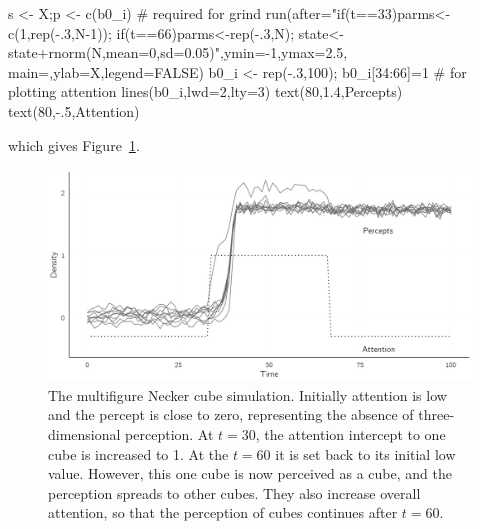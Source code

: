 \documentclass[
  a4paper,
  DIV=11,
  numbers=noendperiod,
  oneside]{scrreprt}
\newenvironment{Shaded}{\begin{snugshade}}{\end{snugshade}}
\newcommand{\AttributeTok}[1]{\textcolor[rgb]{0.40,0.45,0.13}{#1}}
\newcommand{\CommentTok}[1]{\textcolor[rgb]{0.37,0.37,0.37}{#1}}
\newcommand{\ConstantTok}[1]{\textcolor[rgb]{0.56,0.35,0.01}{#1}}
\newcommand{\DecValTok}[1]{\textcolor[rgb]{0.68,0.00,0.00}{#1}}
\newcommand{\FloatTok}[1]{\textcolor[rgb]{0.68,0.00,0.00}{#1}}
\newcommand{\FunctionTok}[1]{\textcolor[rgb]{0.28,0.35,0.67}{#1}}
\newcommand{\NormalTok}[1]{\textcolor[rgb]{0.00,0.23,0.31}{#1}}
\newcommand{\OtherTok}[1]{\textcolor[rgb]{0.00,0.23,0.31}{#1}}
\newcommand{\SpecialCharTok}[1]{\textcolor[rgb]{0.37,0.37,0.37}{#1}}
\newcommand{\StringTok}[1]{\textcolor[rgb]{0.13,0.47,0.30}{#1}}
\begin{document}
\begin{Shaded}
\begin{Highlighting}[]
\NormalTok{s }\OtherTok{\textless{}{-}}\NormalTok{ X;p }\OtherTok{\textless{}{-}} \FunctionTok{c}\NormalTok{(b0\_i) }\CommentTok{\# required for grind}
\FunctionTok{run}\NormalTok{(}\AttributeTok{after=}\StringTok{"if(t==33)parms\textless{}{-}c(1,rep({-}.3,N{-}1));}
\StringTok{           if(t==66)parms\textless{}{-}rep({-}.3,N);}
\StringTok{           state\textless{}{-}state+rnorm(N,mean=0,sd=0.05)"}\NormalTok{,}\AttributeTok{ymin=}\SpecialCharTok{{-}}\DecValTok{1}\NormalTok{,}\AttributeTok{ymax=}\FloatTok{2.5}\NormalTok{,}
            \AttributeTok{main=}\StringTok{\textquotesingle{}\textquotesingle{}}\NormalTok{,}\AttributeTok{ylab=}\StringTok{\textquotesingle{}X\textquotesingle{}}\NormalTok{,}\AttributeTok{legend=}\ConstantTok{FALSE}\NormalTok{)}
\NormalTok{b0\_i }\OtherTok{\textless{}{-}} \FunctionTok{rep}\NormalTok{(}\SpecialCharTok{{-}}\NormalTok{.}\DecValTok{3}\NormalTok{,}\DecValTok{100}\NormalTok{); b0\_i[}\DecValTok{34}\SpecialCharTok{:}\DecValTok{66}\NormalTok{]}\OtherTok{=}\DecValTok{1} \CommentTok{\# for plotting attention}
\FunctionTok{lines}\NormalTok{(b0\_i,}\AttributeTok{lwd=}\DecValTok{2}\NormalTok{,}\AttributeTok{lty=}\DecValTok{3}\NormalTok{)}
\FunctionTok{text}\NormalTok{(}\DecValTok{80}\NormalTok{,}\FloatTok{1.4}\NormalTok{,}\StringTok{\textquotesingle{}Percepts\textquotesingle{}}\NormalTok{)}
\FunctionTok{text}\NormalTok{(}\DecValTok{80}\NormalTok{,}\SpecialCharTok{{-}}\NormalTok{.}\DecValTok{5}\NormalTok{,}\StringTok{\textquotesingle{}Attention\textquotesingle{}}\NormalTok{)}
\end{Highlighting}
\end{Shaded}

which gives Figure~\ref{fig-ch4n-img19-old-67}.

\begin{figure}

{\centering \includegraphics{media/ch4n/fig-ch4n-img19-old-67.png}

}

\caption{\label{fig-ch4n-img19-old-67}The multifigure Necker cube
simulation. Initially attention is low and the percept is close to zero,
representing the absence of three-dimensional perception. At \(t = 30\),
the attention intercept to one cube is increased to 1. At the \(t = 60\)
it is set back to its initial low value. However, this one cube is now
perceived as a cube, and the perception spreads to other cubes. They
also increase overall attention, so that the perception of cubes
continues after \(t = 60\).}

\end{figure}
\end{document}
